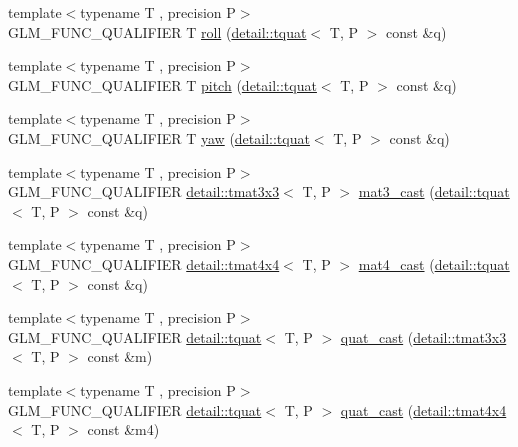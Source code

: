 \begin{DoxyCompactItemize}
\item 
{\footnotesize template$<$typename T , precision P$>$ }\\G\+L\+M\+\_\+\+F\+U\+N\+C\+\_\+\+Q\+U\+A\+L\+I\+F\+I\+ER T \hyperlink{group__gtc__quaternion_ga6d883e423bc425f4334fcce202131f7e}{roll} (\hyperlink{structglm_1_1detail_1_1tquat}{detail\+::tquat}$<$ T, P $>$ const \&q)
\item 
{\footnotesize template$<$typename T , precision P$>$ }\\G\+L\+M\+\_\+\+F\+U\+N\+C\+\_\+\+Q\+U\+A\+L\+I\+F\+I\+ER T \hyperlink{group__gtc__quaternion_ga4d345dc369a54f53f5ebc375bac56d11}{pitch} (\hyperlink{structglm_1_1detail_1_1tquat}{detail\+::tquat}$<$ T, P $>$ const \&q)
\item 
{\footnotesize template$<$typename T , precision P$>$ }\\G\+L\+M\+\_\+\+F\+U\+N\+C\+\_\+\+Q\+U\+A\+L\+I\+F\+I\+ER T \hyperlink{group__gtc__quaternion_ga1de7653ddf380ff06d2300eea831664c}{yaw} (\hyperlink{structglm_1_1detail_1_1tquat}{detail\+::tquat}$<$ T, P $>$ const \&q)
\item 
{\footnotesize template$<$typename T , precision P$>$ }\\G\+L\+M\+\_\+\+F\+U\+N\+C\+\_\+\+Q\+U\+A\+L\+I\+F\+I\+ER \hyperlink{structglm_1_1detail_1_1tmat3x3}{detail\+::tmat3x3}$<$ T, P $>$ \hyperlink{group__gtc__quaternion_ga65257c3494022ad80a50ce11da95049d}{mat3\+\_\+cast} (\hyperlink{structglm_1_1detail_1_1tquat}{detail\+::tquat}$<$ T, P $>$ const \&q)
\item 
{\footnotesize template$<$typename T , precision P$>$ }\\G\+L\+M\+\_\+\+F\+U\+N\+C\+\_\+\+Q\+U\+A\+L\+I\+F\+I\+ER \hyperlink{structglm_1_1detail_1_1tmat4x4}{detail\+::tmat4x4}$<$ T, P $>$ \hyperlink{group__gtc__quaternion_gafc4e34c836f7ccb5f3bb2a0373c831e0}{mat4\+\_\+cast} (\hyperlink{structglm_1_1detail_1_1tquat}{detail\+::tquat}$<$ T, P $>$ const \&q)
\item 
{\footnotesize template$<$typename T , precision P$>$ }\\G\+L\+M\+\_\+\+F\+U\+N\+C\+\_\+\+Q\+U\+A\+L\+I\+F\+I\+ER \hyperlink{structglm_1_1detail_1_1tquat}{detail\+::tquat}$<$ T, P $>$ \hyperlink{group__gtc__quaternion_gafb826745dedb1760100bbd25d0f63fde}{quat\+\_\+cast} (\hyperlink{structglm_1_1detail_1_1tmat3x3}{detail\+::tmat3x3}$<$ T, P $>$ const \&m)
\item 
{\footnotesize template$<$typename T , precision P$>$ }\\G\+L\+M\+\_\+\+F\+U\+N\+C\+\_\+\+Q\+U\+A\+L\+I\+F\+I\+ER \hyperlink{structglm_1_1detail_1_1tquat}{detail\+::tquat}$<$ T, P $>$ \hyperlink{group__gtc__quaternion_ga385af22ef1a45c4464ddd28b80d5ce18}{quat\+\_\+cast} (\hyperlink{structglm_1_1detail_1_1tmat4x4}{detail\+::tmat4x4}$<$ T, P $>$ const \&m4)

\end{DoxyCompactItemize}
